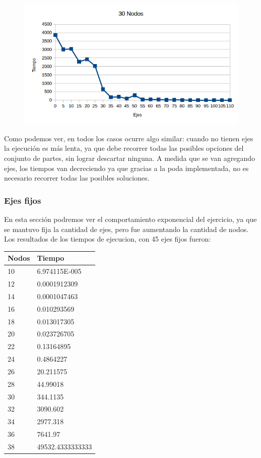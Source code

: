    \begin{figure}[h!]
   \begin{center}
 	\includegraphics[scale=0.7]{imagenes/exacto/30Nodos.png}
   \end{center}
 \end{figure}
 
Como podemos ver, en todos los casos ocurre algo similar: cuando no tienen ejes la ejecuci\'on es m\'as lenta, ya que debe recorrer todas las posibles opciones del conjunto de partes, sin lograr descartar ninguna.
A medida que se van agregando ejes, los tiempos van decreciendo ya que gracias a la poda implementada, no es necesario recorrer todas las posibles soluciones.\\

\subsubsection{Ejes fijos}
En esta secci\'on podremos ver el comportamiento exponencial del ejercicio, ya que se mantuvo fija la cantidad de ejes, pero fue aumentando la cantidad de nodos.
Los resultados de los tiempos de ejecucion, con 45 ejes fijos fueron:\\

\begin{tabular}{| l | l |}
\hline
 Nodos & Tiempo  \\ \hline
10 & 6.974115E-005 \\ \hline
12 & 0.0001912309 \\ \hline
14 & 0.0001047463 \\ \hline
16 & 0.010293569 \\ \hline
18 & 0.013017305 \\ \hline
20 & 0.023726705 \\ \hline
22 & 0.13164895 \\ \hline
24 & 0.4864227 \\ \hline
26 & 20.211575 \\ \hline
28 & 44.99018 \\ \hline
30 & 344.1135 \\ \hline
32 & 3090.602 \\ \hline
34 & 2977.318 \\ \hline
36 & 7641.97 \\ \hline
38 & 49532.4333333333 \\ \hline
\end{tabular}


